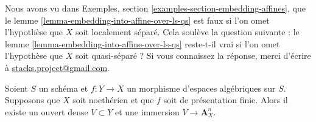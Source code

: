 \begin{remark}
\label{remark-cannot-embed-in-general}
Nous avons vu dans Exemples, section \ref{examples-section-embedding-affines},
que le lemme \ref{lemma-embedding-into-affine-over-ls-qs}
est faux si l'on omet l'hypothèse que $X$ soit localement séparé.
Cela soulève la question suivante : le
lemme \ref{lemma-embedding-into-affine-over-ls-qs}
reste-t-il vrai si l'on omet l'hypothèse que $X$ soit quasi-séparé ?
Si vous connaissez la réponse, merci d'écrire à
\href{mailto:stacks.project@gmail.com}{stacks.project@gmail.com}.
\end{remark}

\begin{lemma}
\label{lemma-embedding-into-affine-over-qs}
Soient $S$ un schéma et $f : Y \to X$ un morphisme d'espaces
algébriques sur $S$. Supposons que $X$ soit noethérien et que $f$ soit de présentation finie.
Alors il existe un ouvert dense $V \subset Y$ et une immersion
$V \to \mathbf{A}^n_X$.
\end{lemma}

